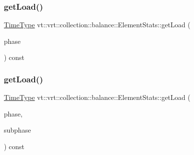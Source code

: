 \subsubsection{\texorpdfstring{get\+Load()}{getLoad()}\hspace{0.1cm}{\footnotesize\ttfamily [1/2]}}
{\footnotesize\ttfamily \hyperlink{namespacevt_a876a9d0cd5a952859c72de8a46881442}{Time\+Type} vt\+::vrt\+::collection\+::balance\+::\+Element\+Stats\+::get\+Load (\begin{DoxyParamCaption}\item[{\hyperlink{namespacevt_a46ce6733d5cdbd735d561b7b4029f6d7}{Phase\+Type} const \&}]{phase }\end{DoxyParamCaption}) const}

\mbox{\label{structvt_1_1vrt_1_1collection_1_1balance_1_1_element_stats_a04ffe937cfa084fb7bb52820312ec9c2}} 
\subsubsection{\texorpdfstring{get\+Load()}{getLoad()}\hspace{0.1cm}{\footnotesize\ttfamily [2/2]}}
{\footnotesize\ttfamily \hyperlink{namespacevt_a876a9d0cd5a952859c72de8a46881442}{Time\+Type} vt\+::vrt\+::collection\+::balance\+::\+Element\+Stats\+::get\+Load (\begin{DoxyParamCaption}\item[{\hyperlink{namespacevt_a46ce6733d5cdbd735d561b7b4029f6d7}{Phase\+Type}}]{phase,  }\item[{\hyperlink{namespacevt_ae78cbfdf1e57470e33eedb074f2beeba}{Subphase\+Type}}]{subphase }\end{DoxyParamCaption}) const}

\mbox{\label{structvt_1_1vrt_1_1collection_1_1balance_1_1_element_stats_a24fcc0af9fb6017b556828a52431bc1c}} 
